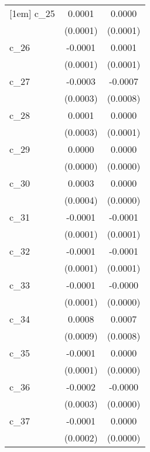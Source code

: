 {\begin{tabular}{l*{2}{c}}
[1em]
c\_25        &      0.0001        &      0.0000        \\
            &    (0.0001)        &    (0.0001)        \\
[1em]
c\_26        &     -0.0001        &      0.0001        \\
            &    (0.0001)        &    (0.0001)        \\
[1em]
c\_27        &     -0.0003        &     -0.0007        \\
            &    (0.0003)        &    (0.0008)        \\
[1em]
c\_28        &      0.0001        &      0.0000        \\
            &    (0.0003)        &    (0.0001)        \\
[1em]
c\_29        &      0.0000        &      0.0000        \\
            &    (0.0000)        &    (0.0000)        \\
[1em]
c\_30        &      0.0003        &      0.0000        \\
            &    (0.0004)        &    (0.0000)        \\
[1em]
c\_31        &     -0.0001        &     -0.0001        \\
            &    (0.0001)        &    (0.0001)        \\
[1em]
c\_32        &     -0.0001        &     -0.0001        \\
            &    (0.0001)        &    (0.0001)        \\
[1em]
c\_33        &     -0.0001        &     -0.0000        \\
            &    (0.0001)        &    (0.0000)        \\
[1em]
c\_34        &      0.0008        &      0.0007        \\
            &    (0.0009)        &    (0.0008)        \\
[1em]
c\_35        &     -0.0001        &      0.0000        \\
            &    (0.0001)        &    (0.0000)        \\
[1em]
c\_36        &     -0.0002        &     -0.0000        \\
            &    (0.0003)        &    (0.0000)        \\
[1em]
c\_37        &     -0.0001        &      0.0000        \\
            &    (0.0002)        &    (0.0000)        \\

\end{tabular}}
